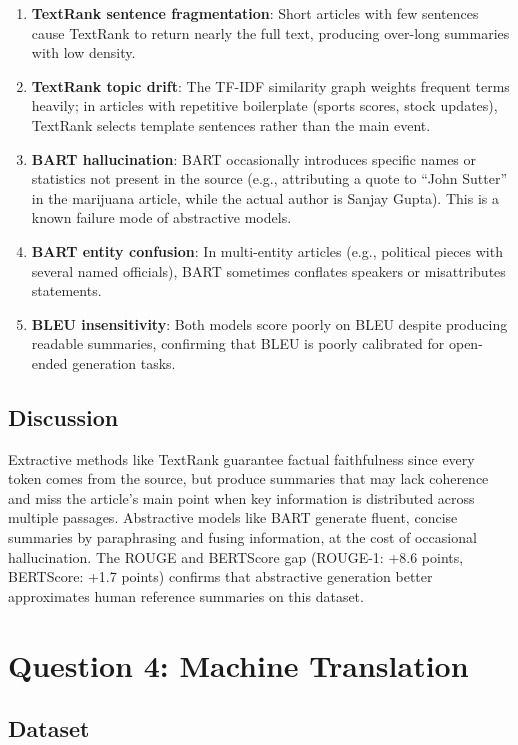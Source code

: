 \documentclass[12pt,a4paper]{article}
\begin{document}
\begin{enumerate}
    \item \textbf{TextRank sentence fragmentation}: Short articles with few sentences cause TextRank to return nearly the full text, producing over-long summaries with low density.
    \item \textbf{TextRank topic drift}: The TF-IDF similarity graph weights frequent terms heavily; in articles with repetitive boilerplate (sports scores, stock updates), TextRank selects template sentences rather than the main event.
    \item \textbf{BART hallucination}: BART occasionally introduces specific names or statistics not present in the source (e.g., attributing a quote to ``John Sutter'' in the marijuana article, while the actual author is Sanjay Gupta). This is a known failure mode of abstractive models.
    \item \textbf{BART entity confusion}: In multi-entity articles (e.g., political pieces with several named officials), BART sometimes conflates speakers or misattributes statements.
    \item \textbf{BLEU insensitivity}: Both models score poorly on BLEU despite producing readable summaries, confirming that BLEU is poorly calibrated for open-ended generation tasks.
\end{enumerate}

\subsection{Discussion}

Extractive methods like TextRank guarantee factual faithfulness since every token comes from the source, but produce summaries that may lack coherence and miss the article's main point when key information is distributed across multiple passages. Abstractive models like BART generate fluent, concise summaries by paraphrasing and fusing information, at the cost of occasional hallucination. The ROUGE and BERTScore gap (ROUGE-1: +8.6 points, BERTScore: +1.7 points) confirms that abstractive generation better approximates human reference summaries on this dataset.

\section{Question 4: Machine Translation}

\subsection{Dataset}
\end{document}
